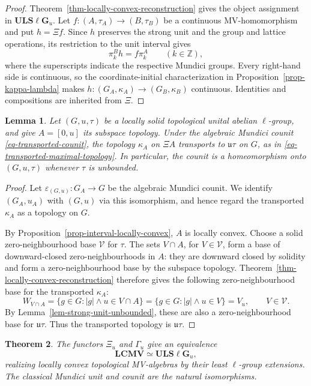 \documentclass[preprint,3p]{elsarticle}
\theoremstyle{plain}
\newtheorem{thm}{Theorem}[section]
\newtheorem{lem}[thm]{Lemma}
\theoremstyle{definition}
\newcommand{\LCMV}{\mathbf{LCMV}}
\newcommand{\ULS}{\mathbf{ULS\ell G}_{u}}
\numberwithin{equation}{section}
\begin{document}
\begin{proof}
Theorem~\ref{thm-locally-convex-reconstruction} gives the object
assignment in $\ULS$.
Let $f\colon(A,\tau_A)\longrightarrow(B,\tau_B)$ be a continuous
MV-homomorphism and put $h=\Xi f$.
Since $h$ preserves the strong unit and the group and lattice
operations, its restriction to the unit interval gives
\[
 \pi_k^B h=f\pi_k^A\qquad(k\in\mathbb Z),
\]
where the superscripts indicate the respective Mundici groups.
Every right-hand side is continuous, so the coordinate-initial
characterization in Proposition~\ref{prop-kappa-lambda} makes
$h\colon(G_A,\kappa_A)\longrightarrow(G_B,\kappa_B)$ continuous.
Identities and compositions are inherited from $\Xi$.
\end{proof}

\begin{lem}
\label{lem-recover-unbounded-topology}
Let $(G,u,\tau)$ be a locally solid topological unital abelian
$\ell$-group, and give $A=[0,u]$ its subspace topology.
Under the algebraic Mundici counit
\eqref{eq-transported-counit}, the topology $\kappa_A$
on $\Xi A$ transports to $\mathfrak u\tau$ on $G$, 
as in \eqref{eq-transported-maximal-topology}.
In particular, the counit is a homeomorphism onto
$(G,u,\tau)$ whenever $\tau$ is unbounded.
\end{lem}

\begin{proof}
Let $\varepsilon_{(G,u)}\colon G_A\longrightarrow G$
be the algebraic Mundici counit.  We identify
$(G_A,u_A)$ with $(G,u)$ via this isomorphism,
and hence regard the transported $\kappa_A$ as
a topology on $G$.

By Proposition~\ref{prop-interval-locally-convex},
$A$ is locally convex.
Choose a solid zero-neighbourhood base $\mathcal V$
for $\tau$.
The sets $V\cap A$, for $V\in\mathcal V$, form a base of
downward-closed zero-neighbourhoods in $A$: they are
downward closed by solidity and form a zero-neighbourhood
base by the subspace topology.
Theorem~\ref{thm-locally-convex-reconstruction}
therefore gives the following zero-neighbourhood base
for the transported $\kappa_A$:
\[
 W_{V\cap A}
 =\{g\in G:|g|\wedge u\in V\cap A\}
 =\{g\in G:|g|\wedge u\in V\}
 =V_u,\qquad V\in\mathcal V.
\]
By Lemma~\ref{lem-strong-unit-unbounded}, these are also
a zero-neighbourhood base for $\mathfrak u\tau$.
Thus the transported topology is $\mathfrak u\tau$.
\end{proof}

\begin{thm}
\label{thm-locally-convex-equivalence}
The functors $\Xi_u$ and $\Gamma_u$ give an equivalence
\[
 \LCMV\simeq\ULS,
\]
realizing locally convex topological MV-algebras by their least
$\ell$-group extensions.  The classical Mundici unit and counit are
the natural isomorphisms.
\end{thm}
\end{document}
